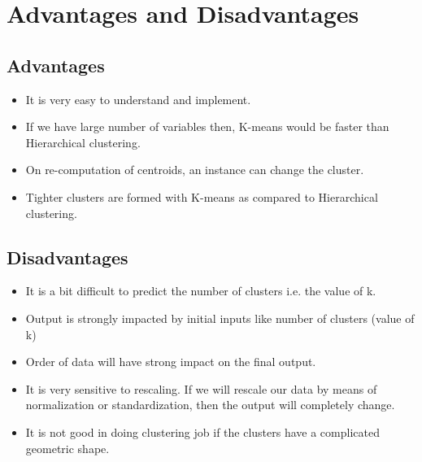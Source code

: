 \section{Advantages and Disadvantages}
    \subsection{Advantages}
        \begin{itemize}
            \item It is very easy to understand and implement.
            \item If we have large number of variables then, K-means would be faster than Hierarchical clustering.
            \item On re-computation of centroids, an instance can change the cluster.
            \item Tighter clusters are formed with K-means as compared to Hierarchical clustering.
        \end{itemize}
    \subsection{Disadvantages}
        \begin{itemize}
            \item It is a bit difficult to predict the number of clusters i.e. the value of k.
            \item Output is strongly impacted by initial inputs like number of clusters (value of k)
            \item Order of data will have strong impact on the final output.
            \item It is very sensitive to rescaling. If we will rescale our data by means of normalization or standardization, then the output will completely change.
            \item It is not good in doing clustering job if the clusters have a complicated geometric shape.
        \end{itemize}